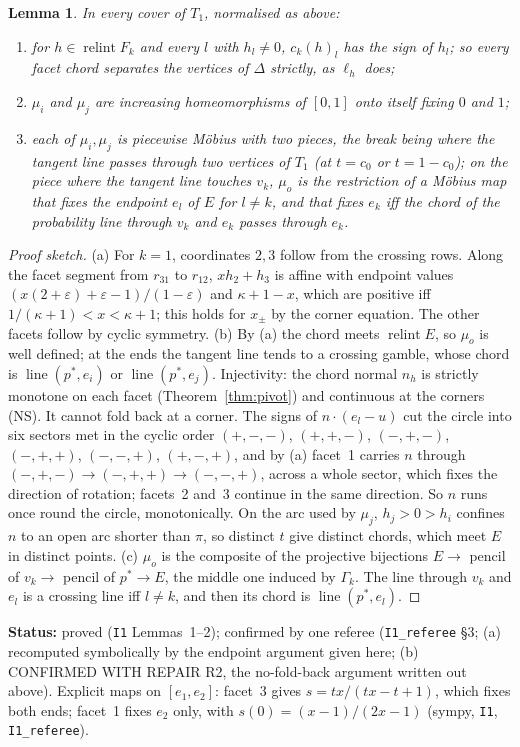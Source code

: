 \documentclass[11pt]{article}
\newtheorem{lemma}[theorem]{Lemma}
\theoremstyle{definition}
\theoremstyle{remark}
\newcommand{\relint}{\operatorname{relint}}
\newcommand{\lin}{\operatorname{line}}
\newcommand{\src}[1]{\texttt{#1}}
\newcommand{\status}[1]{\par\smallskip\noindent\textbf{Status:} #1\par\smallskip}
\begin{document}
\begin{lemma}\label{lem:edgemaps}
In every cover of $T_1$, normalised as above:
\begin{enumerate}[leftmargin=*,label=(\alph*)]
\item for $h\in\relint F_k$ and every $l$ with $h_l\ne0$, $c_k(h)_l$ has the sign of $h_l$; so every facet chord separates the vertices of $\Delta$ strictly, as $\ell_h$ does;
\item $\mu_i$ and $\mu_j$ are increasing homeomorphisms of $[0,1]$ onto itself fixing $0$ and $1$;
\item each of $\mu_i,\mu_j$ is piecewise M\"obius with two pieces, the break being where the tangent line passes through two vertices of $T_1$ (at $t=c_0$ or $t=1-c_0$); on the piece where the tangent line touches $v_k$, $\mu_o$ is the restriction of a M\"obius map that fixes the endpoint $e_l$ of $E$ for $l\ne k$, and that fixes $e_k$ iff the chord of the probability line through $v_k$ and $e_k$ passes through $e_k$.
\end{enumerate}
\end{lemma}
\begin{proof}[Proof sketch]
(a) For $k=1$, coordinates $2,3$ follow from the crossing rows. Along the facet segment from $r_{31}$ to $r_{12}$, $xh_2+h_3$ is affine with endpoint values $(x(2+\varepsilon)+\varepsilon-1)/(1-\varepsilon)$ and $\kappa+1-x$, which are positive iff $1/(\kappa+1)<x<\kappa+1$; this holds for $x_\pm$ by the corner equation. The other facets follow by cyclic symmetry. (b) By (a) the chord meets $\relint E$, so $\mu_o$ is well defined; at the ends the tangent line tends to a crossing gamble, whose chord is $\lin(p^*,e_i)$ or $\lin(p^*,e_j)$. Injectivity: the chord normal $n_h$ is strictly monotone on each facet (Theorem~\ref{thm:pivot}) and continuous at the corners (NS). It cannot fold back at a corner. The signs of $n\cdot(e_l-u)$ cut the circle into six sectors met in the cyclic order $(+,-,-)$, $(+,+,-)$, $(-,+,-)$, $(-,+,+)$, $(-,-,+)$, $(+,-,+)$, and by (a) facet~1 carries $n$ through $(-,+,-)\to(-,+,+)\to(-,-,+)$, across a whole sector, which fixes the direction of rotation; facets~2 and~3 continue in the same direction. So $n$ runs once round the circle, monotonically. On the arc used by $\mu_j$, $h_j>0>h_i$ confines $n$ to an open arc shorter than $\pi$, so distinct $t$ give distinct chords, which meet $E$ in distinct points. (c) $\mu_o$ is the composite of the projective bijections $E\to$ pencil of $v_k\to$ pencil of $p^*\to E$, the middle one induced by $\Gamma_k$. The line through $v_k$ and $e_l$ is a crossing line iff $l\ne k$, and then its chord is $\lin(p^*,e_l)$.
\end{proof}
\status{proved (\src{I1} Lemmas~1--2); confirmed by one referee (\src{I1\_referee} \S3; (a) recomputed symbolically by the endpoint argument given here; (b) CONFIRMED WITH REPAIR R2, the no-fold-back argument written out above). Explicit maps on $[e_1,e_2]$: facet~3 gives $s=tx/(tx-t+1)$, which fixes both ends; facet~1 fixes $e_2$ only, with $s(0)=(x-1)/(2x-1)$ (sympy, \src{I1}, \src{I1\_referee}).}
\end{document}
